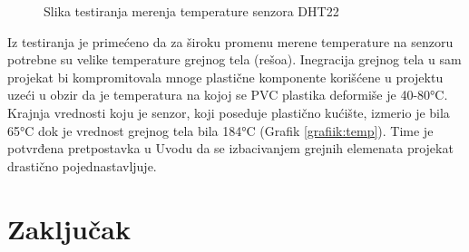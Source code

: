 \documentclass[a4paper, 12pt]{article}
\begin{document}
\begin{figure}[H]
\centering
{}
\caption{Slika testiranja merenja temperature senzora DHT22} \label{fig:test_temp}
\end{figure}

\pagebreak

Iz testiranja je primećeno da za široku promenu merene temperature na senzoru potrebne su velike temperature grejnog tela (rešoa). Inegracija grejnog tela u sam projekat bi kompromitovala mnoge plastične komponente korišćene u projektu uzeći u obzir da je temperatura na kojoj se PVC plastika deformiše je 40-80°C. Krajnja vrednosti koju je senzor, koji poseduje plastično kućište, izmerio je bila 65°C dok je vrednost grejnog tela bila 184°C (Grafik \ref{grafiik:temp}). Time je potvrđena pretpostavka u Uvodu da se izbacivanjem grejnih elemenata projekat drastično pojednastavljuje. 

\vspace{10pt}

\begin{grafik}
\begin{center}
\end{center}			
\caption{Testiranja merenja temperature senzora DHT22}\label{grafiik:temp}
\end{grafik}

\pagebreak
\endgroup

\begingroup
\justifying
\section{Zaključak}

\vspace{10pt}
\end{document}
